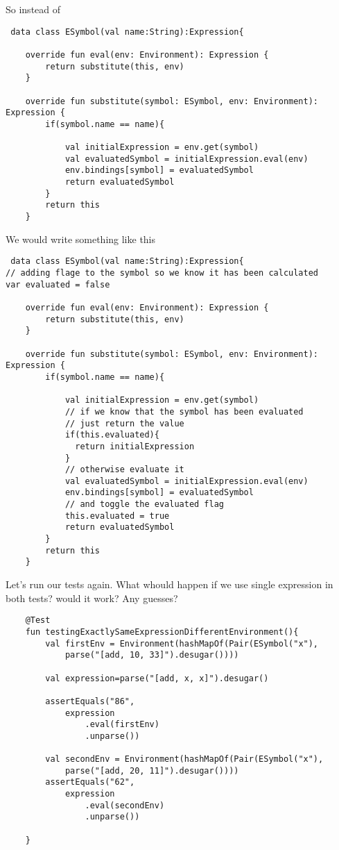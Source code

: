 \documentclass[11pt]{article}
\begin{document}
So instead of
\begin{verbatim}
 data class ESymbol(val name:String):Expression{

    override fun eval(env: Environment): Expression {
        return substitute(this, env)
    }

    override fun substitute(symbol: ESymbol, env: Environment): Expression {
        if(symbol.name == name){

            val initialExpression = env.get(symbol)
            val evaluatedSymbol = initialExpression.eval(env)
            env.bindings[symbol] = evaluatedSymbol
            return evaluatedSymbol
        }
        return this
    }

\end{verbatim}

We would write something like this

\begin{verbatim}
 data class ESymbol(val name:String):Expression{
// adding flage to the symbol so we know it has been calculated
var evaluated = false

    override fun eval(env: Environment): Expression {
        return substitute(this, env)
    }

    override fun substitute(symbol: ESymbol, env: Environment): Expression {
        if(symbol.name == name){

            val initialExpression = env.get(symbol)
            // if we know that the symbol has been evaluated
            // just return the value
            if(this.evaluated){
              return initialExpression
            }
            // otherwise evaluate it
            val evaluatedSymbol = initialExpression.eval(env)
            env.bindings[symbol] = evaluatedSymbol
            // and toggle the evaluated flag
            this.evaluated = true
            return evaluatedSymbol
        }
        return this
    }

\end{verbatim}

Let's run our tests again.
What whould happen if we use single expression in both tests?
would it work? Any guesses?
\begin{verbatim}
    @Test
    fun testingExactlySameExpressionDifferentEnvironment(){
        val firstEnv = Environment(hashMapOf(Pair(ESymbol("x"),
            parse("[add, 10, 33]").desugar())))

        val expression=parse("[add, x, x]").desugar()

        assertEquals("86",
            expression
                .eval(firstEnv)
                .unparse())

        val secondEnv = Environment(hashMapOf(Pair(ESymbol("x"),
            parse("[add, 20, 11]").desugar())))
        assertEquals("62",
            expression
                .eval(secondEnv)
                .unparse())

    }
\end{verbatim}
\end{document}

